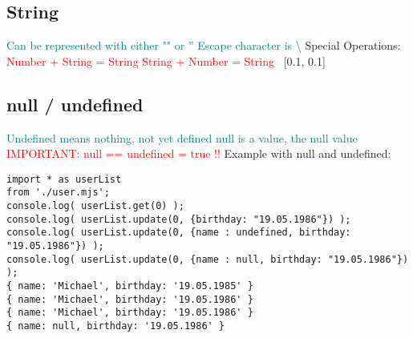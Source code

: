 \documentclass[main.tex,fontsize=6pt,paper=a4,paper=landscape,DIV=calc,]{scrartcl}
\begin{document}
\begin{multicols*}{4}
\begin{itemize}
\end{itemize}

\subsection{String}  
\textcolor{teal}{Can be represented with either "" or ''}\newline
\textcolor{teal}{Escape character is \textbackslash}\newline
{}
{
  Special Operations:\newline
  \textcolor{red}{Number + String = String}\newline
  \textcolor{red}{String + Number = String}\newline
  \, \newline
}[0.1, 0.1]

\subsection{null / undefined}  
\textcolor{teal}{Undefined means nothing, not yet defined}\newline
\textcolor{teal}{null is a value, the null value}\newline
\textcolor{red}{IMPORTANT: null == undefined = true !!}\newline
Example with null and undefined:
\begin{lstlisting}
import * as userList
from './user.mjs';
console.log( userList.get(0) );
console.log( userList.update(0, {birthday: "19.05.1986"}) );
console.log( userList.update(0, {name : undefined, birthday: "19.05.1986"}) );
console.log( userList.update(0, {name : null, birthday: "19.05.1986"}) );
{ name: 'Michael', birthday: '19.05.1985' }
{ name: 'Michael', birthday: '19.05.1986' }
{ name: 'Michael', birthday: '19.05.1986' }
{ name: null, birthday: '19.05.1986' }
\end{lstlisting}
\, \newline



\end{multicols*}
\end{document}
